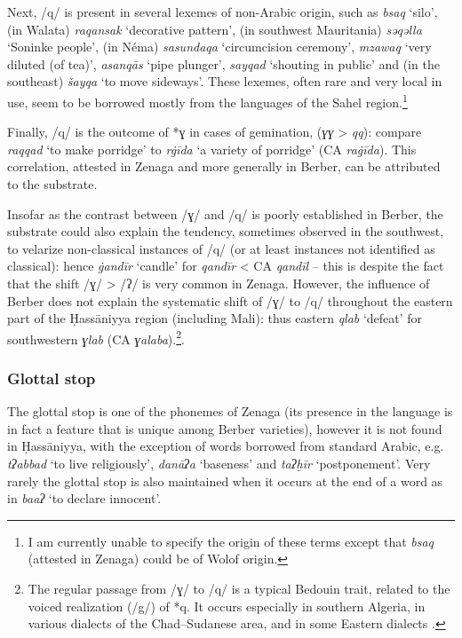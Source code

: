 \documentclass[output=paper]{langsci/langscibook}
\begin{document}
Next, /q/ is present in several lexemes of non-Arabic origin, such as \textit{bsaq} ‘silo’, (in Walata) \textit{raqansak} ‘decorative pattern’, (in southwest Mauritania) \textit{sə{\R}qəlla} ‘Soninke people’, (in Néma) \textit{sasundaqa} ‘circumcision ceremony’, \textit{mzaw{\R}aq} ‘very diluted (of tea)’, \textit{asanqās} ‘pipe plunger’, \textit{sayqad} ‘shouting in public’ and (in the southeast) \textit{šayqa} ‘to move sideways’. These lexemes, often rare and very local in use, seem to be borrowed mostly from the languages of the Sahel region.\footnote{I am currently unable to specify the origin of these terms except that \textit{bsaq} (attested in Zenaga) could be of Wolof origin.}

Finally, /q/ is the outcome of *ɣ in cases of gemination, (\textit{ɣɣ} > \textit{qq}): compare \textit{raqqad} ‘to make porridge’ to \textit{r\.gīda} ‘a variety of porridge’ (CA \textit{ra\.gīda}). This correlation, attested in Zenaga and more generally in Berber, can be attributed to the substrate.

Insofar as the contrast between /ɣ/ and /q/ is poorly established in Berber, the substrate could also explain the tendency, sometimes observed in the southwest, to velarize non-classical instances of /q/ (or at least instances not identified as classical): hence \textit{\.gandīr} ‘candle’ for \textit{qandīr} < CA \textit{qandīl} – this is despite the fact that the shift /ɣ/ > /ʔ/ is very common in Zenaga. However, the influence of Berber does not explain the systematic shift of /ɣ/ to /q/ throughout the eastern part of the Ḥassāniyya region (including Mali): thus eastern \textit{qlab} ‘defeat’ for southwestern \textit{ɣlab} (CA \textit{ɣalaba}).\footnote{The regular passage from /ɣ/ to /q/ is a typical Bedouin trait, related to the voiced realization (/g/) of *q. It occurs especially in southern Algeria, in various dialects of the Chad–Sudanese area, and in some Eastern dialects \citep[72]{Cantineau1960}.}.

\subsubsection{ Glottal stop} %
The glottal stop is one of the phonemes of Zenaga (its presence in the language is in fact a feature that is unique among Berber varieties), however it is not found in Ḥassāniyya, with the exception of words borrowed from standard Arabic, e.g. \textit{tʔabbad} ‘to live religiously’, \textit{danāʔa} ‘baseness’ and \textit{taʔḫīr} ‘postponement’. Very rarely the glottal stop is also maintained when it occurs at the end of a word as in \textit{ba{\R}{\R}aʔ} ‘to declare innocent’.
\end{document}
